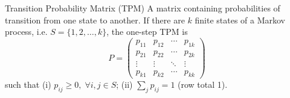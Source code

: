 \documentclass[aspectratio=169]{beamer}
\begin{document}
 
    \begin{frame}{Transition Probability Matrix (TPM)}
        A matrix containing probabilities of transition from one state to another. If there are $k$ finite states of a Markov process, i.e. $S = \{1, 2, \ldots, k\}$, the one-step TPM is
        \[
            P = \begin{pmatrix} p_{11} & p_{12} & \cdots & p_{1k} \\ p_{21} & p_{22} & \cdots & p_{2k} \\ \vdots & \vdots & \ddots & \vdots \\ p_{k1} & p_{k2} & \cdots & p_{kk} \end{pmatrix}
        \]
            such that (i) $p_{ij} \geq 0, \; \forall i, j \in S$; (ii) $\sum_j p_{ij} = 1$ (row total 1).
    \end{frame}
 
\end{document}
